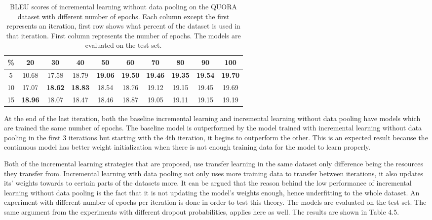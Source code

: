 \begin{table}[b]
\centering
\small
 \begin{tabular}{|c | c | c | c | c | c | c | c | c | c |} 
 \hline
 \% & 20 & 30 & 40 & 50 & 60 & 70 & 80 & 90 & 100 \\ [0.5ex] 
 \hline
  5 & 10.68 & 17.58 & 18.79 & \textbf{19.06} & \textbf{19.50} & \textbf{19.46} & \textbf{19.35} & \textbf{19.54} & \textbf{19.70}  \\ 
 \hline
  10 & 17.07 & \textbf{18.62} & \textbf{18.83} & 18.54 & 18.76 & 19.12 & 19.15 & 19.45 & 19.69 \\ 
 \hline
 15 & \textbf{18.96} & 18.07 & 18.47 & 18.46 & 18.87 & 19.05 & 19.11 & 19.15 & 19.19 \\ 
 \hline
\end{tabular}
\caption{BLEU scores of incremental learning without data pooling on the QUORA dataset with different number of epochs. Each column except the first represents an iteration, first row shows what percent of the dataset is used in that iteration. First column represents the number of epochs. The models are evaluated on the test set.}
\end{table}

At the end of the last iteration, both the baseline incremental learning and incremental learning without data pooling have models which are trained the same number of epochs. The baseline model is outperformed by the model trained with incremental learning without data pooling in the first 3 iterations but starting with the 4th iteration, it begins to outperform the other. This is an expected result because the continuous model has better weight initialization when there is not enough training data for the model to learn properly.

Both of the incremental learning strategies that are proposed, use transfer learning in the same dataset only difference being the resources they transfer from. Incremental learning with data pooling not only uses more training data to transfer between iterations, it also updates its' weights towards to certain parts of the datasets more. It can be argued that the reason behind the low performance of incremental learning without data pooling is the fact that it is not updating the model's weights enough, hence underfitting to the whole dataset. An experiment with different number of epochs per iteration is done in order to test this theory. The models are evaluated on the test set. The same argument from the experiments with different dropout probabilities, applies here as well. The results are shown in Table 4.5.

